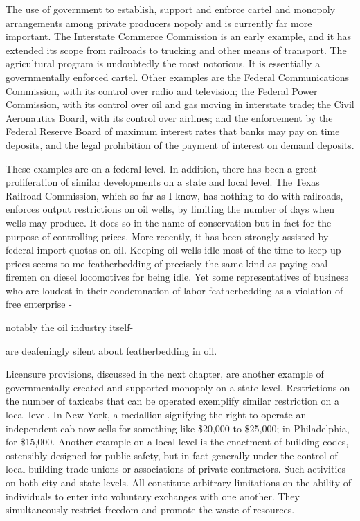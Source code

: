 \documentclass[11pt,openany]{book}
\begin{document}
The use of government to establish, support and enforce cartel and monopoly arrangements among private producers nopoly and is currently far more important. The Interstate Commerce Commission is an early example, and it has extended its scope from railroads to trucking and other means of transport. The agricultural program is undoubtedly the most notorious. It is essentially a governmentally enforced cartel. Other examples are the Federal Communications Commission, with its control over radio and television; the Federal Power Commission, with its control over oil and gas moving in interstate trade; the Civil Aeronautics Board, with its control over airlines; and the enforcement by the Federal Reserve Board of maximum interest rates that banks may pay on time deposits, and the legal prohibition of the payment of interest on demand deposits.

These examples are on a federal level. In addition, there has been a great proliferation of similar developments on a state and local level. The Texas Railroad Commission, which so far as I know, has nothing to do with railroads, enforces output restrictions on oil wells, by limiting the number of days when wells may produce. It does so in the name of conservation but in fact for the purpose of controlling prices. More recently, it has been strongly assisted by federal import quotas on oil. Keeping oil wells idle most of the time to keep up prices seems to me featherbedding of precisely the same kind as paying coal firemen on diesel locomotives for being idle. Yet some representatives of business who are loudest in their condemnation of labor featherbedding as a violation of free enterprise -

notably the oil industry itself-

are deafeningly silent about featherbedding in oil.

Licensure provisions, discussed in the next chapter, are another example of governmentally created and supported monopoly on a state level. Restrictions on the number of taxicabs that can be operated exemplify similar restriction on a local level. In New York, a medallion signifying the right to operate an independent cab now sells for something like \$20,000 to \$25,000; in Philadelphia, for \$15,000. Another example on a local level is the enactment of building codes, ostensibly designed for public safety, but in fact generally under the control of local building trade unions or associations of private contractors. Such activities on both city and state levels. All constitute arbitrary limitations on the ability of individuals to enter into voluntary exchanges with one another. They simultaneously restrict freedom and promote the waste of resources.
\end{document}
